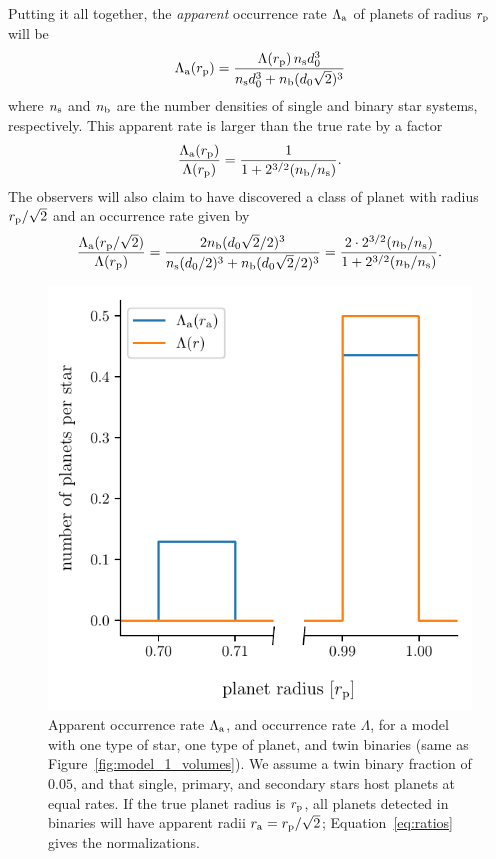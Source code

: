 \documentclass[12pt,modern]{aastex61}
\renewcommand{\a}{_{\rm a}}
\newcommand{\s}{_{\rm s}}
\newcommand{\p}{_{\rm p}}
\renewcommand{\b}{_{\rm b}}
\begin{document}
Putting it all together, the {\it apparent} occurrence rate
$\Lambda\a$ of planets of radius $r\p$ will be
\begin{equation}
    \Lambda\a(r\p) = 
        \frac{\Lambda(r\p) \, n\s d_0^3}
        {n\s d_0^3 + n\b (d_0\sqrt{2})^3}
    \label{eq:rate_at_rp}
\end{equation}
where $n\s$ and $n\b$ are the number densities of single and binary
star systems, respectively.  This apparent rate is larger than the
true rate by a factor
\begin{equation}
    \frac{\Lambda\a(r\p)}{\Lambda(r\p)} = 
        \frac{1}{1 + 2^{3/2}(n\b/n\s)}.
    \label{eq:correction_rp}
\end{equation}
The observers will also claim to have discovered a class of planet
with radius $r\p/\sqrt{2}$ and an occurrence rate given by
\begin{equation}
    \frac{\Lambda\a(r\p/\sqrt{2})}{\Lambda(r\p)}
    =
    \frac{2n\b (d_0\sqrt{2}/2)^3}
      {n\s (d_0/2)^3 + n\b (d_0\sqrt{2}/2)^3}
    =
    \frac{2\cdot2^{3/2}(n\b/n\s)}{1 + 2^{3/2}
    (n\b/n\s)}.
    \label{eq:correction_diluted_rp}
\end{equation}

\begin{figure}[!tb]
    \begin{center}
        \includegraphics[width=.6\textwidth]{figures/occ_rate_vs_radius_model_1_brokenx.pdf}
    \end{center}
    \vspace{-0.5cm}
    \caption{
        Apparent occurrence rate $\Lambda\a$, and occurrence rate $\Lambda$, 
        for a model with one type of star, one
        type of planet, and twin binaries (same as
        Figure~\ref{fig:model_1_volumes}).  We assume a twin binary
        fraction of $0.05$, and that single, primary, and secondary
        stars host planets at equal rates.  If the true planet radius
        is $r\p$, all planets detected in binaries will have apparent
        radii $r\a = r\p/\sqrt{2}$; Equation~\ref{eq:ratios} gives the
        normalizations.
    }
    \label{fig:occ_rate_model_1}
\end{figure}
\end{document}
